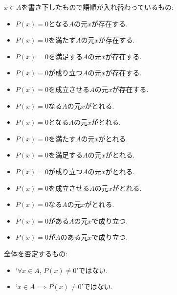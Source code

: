 \documentclass[a4paper,12pt,draft]{amsart}
\begin{document}
$x\in A$を書き下したもので語順が入れ替わっているもの:
\begin{itemize}
\item $P(x)=0$となる$A$の元$x$が存在する.
\item $P(x)=0$を満たす$A$の元$x$が存在する.
\item $P(x)=0$を満足する$A$の元$x$が存在する.
\item $P(x)=0$が成り立つ$A$の元$x$が存在する.
\item $P(x)=0$を成立させる$A$の元$x$が存在する.
\item $P(x)=0$なる$A$の元$x$がとれる.
\item $P(x)=0$となる$A$の元$x$がとれる.
\item $P(x)=0$を満たす$A$の元$x$がとれる.
\item $P(x)=0$を満足する$A$の元$x$がとれる.
\item $P(x)=0$が成り立つ$A$の元$x$がとれる.
\item $P(x)=0$を成立させる$A$の元$x$がとれる.
\item $P(x)=0$なる$A$の元$x$がとれる.
\item $P(x)=0$がある$A$の元$x$で成り立つ.
\item $P(x)=0$が$A$のある元$x$で成り立つ.
\end{itemize}

全体を否定するもの:
\begin{itemize}
\item `$\forall x \in A$, $P(x)\neq 0$'ではない.
\item `$x \in A\implies P(x)\neq 0$'ではない.
\end{itemize}
\end{document}
